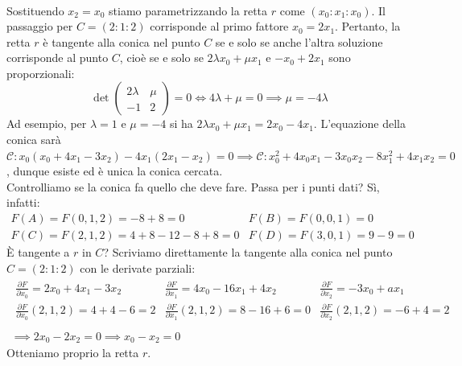 \begin{solution}
\begin{equation*}
\begin{array}{lll}
			\end{array}
		\end{equation*}
	Sostituendo $x_2=x_0$ stiamo parametrizzando la retta $r$ come $(x_0\colon x_1\colon x_0)$. Il passaggio per $C=(2\colon1\colon2)$ corrisponde al primo fattore $x_0=2x_1$. Pertanto, la retta $r$ è tangente alla conica nel punto $C$ se e solo se anche l'altra soluzione corrisponde al punto $C$, cioè se e solo se $2\lambda x_0 +\mu x_1$ e $-x_0+2x_1$ sono proporzionali:
	\begin{equation*}
		\det \begin{pmatrix} 
			2\lambda & \mu \\
			-1 & 2
		\end{pmatrix} =0 \iff 4\lambda +\mu=0 \implies \mu=-4\lambda
	\end{equation*}
	Ad esempio, per $\lambda=1$ e $\mu=-4$ si ha $2\lambda x_0+\mu x_1=2x_0-4x_1$. L'equazione della conica sarà $\mathcal{C} \colon x_0(x_0+4x_1-3x_2) -4x_1(2x_1-x_2)=0 \implies \mathcal{C}\colon x_0^2 +4x_0x_1 -3x_0x_2 -8x_1^2 +4x_1x_2=0$, dunque esiste ed è unica la conica cercata.\\
	Controlliamo se la conica fa quello che deve fare. Passa per i punti dati? Sì, infatti:
	\begin{equation*}
		\begin{array}{ll}
			F(A)=F(0,1,2)=-8+8=0 & F(B)=F(0,0,1)=0 \\
			F(C)=F(2,1,2)= 4+8-12-8+8 =0 & F(D)=F(3,0,1)=9-9=0
		\end{array}
	\end{equation*}
	È tangente a $r$ in $C$? Scriviamo direttamente la tangente alla conica nel punto $C=(2\colon1\colon2)$ con le derivate parziali:
		\begin{gather*}
			\begin{array}{lll}
				\frac{\partial{F}}{\partial{x_0}} = 2x_0+4x_1-3x_2 & \frac{\partial{F}}{\partial{x_1}} = 4x_0-16 x_1 +4x_2 & \frac{\partial{F}}{\partial{x_2}} = -3x_0 +ax_1\\
				\frac{\partial{F}}{\partial{x_0}} (2,1,2) =4+4-6=2 & \frac{\partial{F}}{\partial{x_1}} (2,1,2) =8-16+6=0 & \frac{\partial{F}}{\partial{x_2}} (2,1,2) = -6+4=2\\
			\end{array}\\
			\implies 2x_0-2x_2=0 \implies x_0-x_2=0
		\end{gather*}
	Otteniamo proprio la retta $r$.
\end{solution}